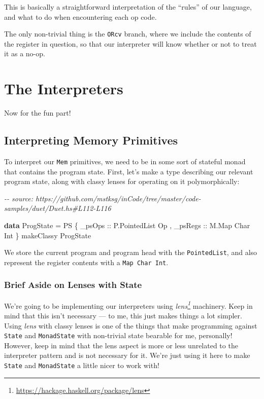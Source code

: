 \documentclass[]{article}
\newenvironment{Shaded}{}{}
\newcommand{\CommentTok}[1]{\textcolor[rgb]{0.38,0.63,0.69}{\textit{#1}}}
\newcommand{\DataTypeTok}[1]{\textcolor[rgb]{0.56,0.13,0.00}{#1}}
\newcommand{\KeywordTok}[1]{\textcolor[rgb]{0.00,0.44,0.13}{\textbf{#1}}}
\newcommand{\NormalTok}[1]{#1}
\newcommand{\OtherTok}[1]{\textcolor[rgb]{0.00,0.44,0.13}{#1}}
\renewcommand{\href}[2]{#2\footnote{\url{#1}}}
\begin{document}
This is basically a straightforward interpretation of the ``rules'' of our
language, and what to do when encountering each op code.

The only non-trivial thing is the \texttt{ORcv} branch, where we include the
contents of the register in question, so that our interpreter will know whether
or not to treat it as a no-op.

\section{The Interpreters}\label{the-interpreters}

Now for the fun part!

\subsection{Interpreting Memory
Primitives}\label{interpreting-memory-primitives}

To interpret our \texttt{Mem} primitives, we need to be in some sort of stateful
monad that contains the program state. First, let's make a type describing our
relevant program state, along with classy lenses for operating on it
polymorphically:

\begin{Shaded}
\begin{Highlighting}[]
\CommentTok{{-}{-} source: https://github.com/mstksg/inCode/tree/master/code{-}samples/duet/Duet.hs\#L112{-}L116}

\KeywordTok{data} \DataTypeTok{ProgState} \OtherTok{=} \DataTypeTok{PS}
\NormalTok{    \{}\OtherTok{ \_psOps  ::} \DataTypeTok{P.PointedList} \DataTypeTok{Op}
\NormalTok{    ,}\OtherTok{ \_psRegs ::} \DataTypeTok{M.Map} \DataTypeTok{Char} \DataTypeTok{Int}
\NormalTok{    \}}
\NormalTok{makeClassy \textquotesingle{}}\DataTypeTok{\textquotesingle{}ProgState}
\end{Highlighting}
\end{Shaded}

We store the current program and program head with the \texttt{PointedList}, and
also represent the register contents with a \texttt{Map\ Char\ Int}.

\subsubsection{Brief Aside on Lenses with
State}\label{brief-aside-on-lenses-with-state}

We're going to be implementing our interpreters using
\emph{\href{https://hackage.haskell.org/package/lens}{lens}} machinery. Keep in
mind that this isn't necessary --- to me, this just makes things a lot simpler.
Using \emph{lens} with classy lenses is one of the things that make programming
against \texttt{State} and \texttt{MonadState} with non-trivial state bearable
for me, personally! However, keep in mind that the lens aspect is more or less
unrelated to the interpreter pattern and is not necessary for it. We're just
using it here to make \texttt{State} and \texttt{MonadState} a little nicer to
work with!
\end{document}

